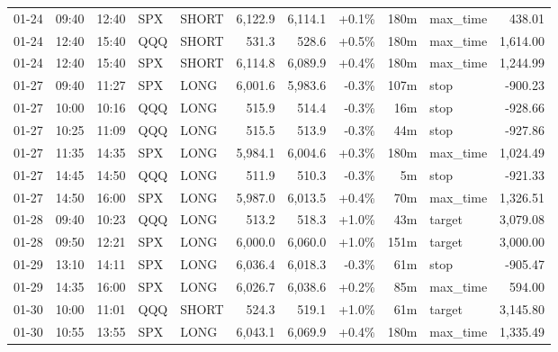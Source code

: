 \documentclass[11pt,a4paper,twoside]{article}
\begin{document}
\begin{center}
\begin{longtable}{>{\color{txtmain}}l l l l l r r r r >{\color{txtmain}}l r}
01-24 & 09:40 & 12:40 & SPX & SHORT & 6,122.9 & 6,114.1 & \textcolor{wingreen}{+0.1\%} & 180m & max\_time & \textcolor{wingreen}{438.01} \\
01-24 & 12:40 & 15:40 & QQQ & SHORT & 531.3 & 528.6 & \textcolor{wingreen}{+0.5\%} & 180m & max\_time & \textcolor{wingreen}{1,614.00} \\
01-24 & 12:40 & 15:40 & SPX & SHORT & 6,114.8 & 6,089.9 & \textcolor{wingreen}{+0.4\%} & 180m & max\_time & \textcolor{wingreen}{1,244.99} \\
01-27 & 09:40 & 11:27 & SPX & LONG & 6,001.6 & 5,983.6 & \textcolor{lossred}{-0.3\%} & 107m & stop & \textcolor{lossred}{-900.23} \\
01-27 & 10:00 & 10:16 & QQQ & LONG & 515.9 & 514.4 & \textcolor{lossred}{-0.3\%} & 16m & stop & \textcolor{lossred}{-928.66} \\
01-27 & 10:25 & 11:09 & QQQ & LONG & 515.5 & 513.9 & \textcolor{lossred}{-0.3\%} & 44m & stop & \textcolor{lossred}{-927.86} \\
01-27 & 11:35 & 14:35 & SPX & LONG & 5,984.1 & 6,004.6 & \textcolor{wingreen}{+0.3\%} & 180m & max\_time & \textcolor{wingreen}{1,024.49} \\
01-27 & 14:45 & 14:50 & QQQ & LONG & 511.9 & 510.3 & \textcolor{lossred}{-0.3\%} & 5m & stop & \textcolor{lossred}{-921.33} \\
01-27 & 14:50 & 16:00 & SPX & LONG & 5,987.0 & 6,013.5 & \textcolor{wingreen}{+0.4\%} & 70m & max\_time & \textcolor{wingreen}{1,326.51} \\
01-28 & 09:40 & 10:23 & QQQ & LONG & 513.2 & 518.3 & \textcolor{wingreen}{+1.0\%} & 43m & target & \textcolor{wingreen}{3,079.08} \\
01-28 & 09:50 & 12:21 & SPX & LONG & 6,000.0 & 6,060.0 & \textcolor{wingreen}{+1.0\%} & 151m & target & \textcolor{wingreen}{3,000.00} \\
01-29 & 13:10 & 14:11 & SPX & LONG & 6,036.4 & 6,018.3 & \textcolor{lossred}{-0.3\%} & 61m & stop & \textcolor{lossred}{-905.47} \\
01-29 & 14:35 & 16:00 & SPX & LONG & 6,026.7 & 6,038.6 & \textcolor{wingreen}{+0.2\%} & 85m & max\_time & \textcolor{wingreen}{594.00} \\
01-30 & 10:00 & 11:01 & QQQ & SHORT & 524.3 & 519.1 & \textcolor{wingreen}{+1.0\%} & 61m & target & \textcolor{wingreen}{3,145.80} \\
01-30 & 10:55 & 13:55 & SPX & LONG & 6,043.1 & 6,069.9 & \textcolor{wingreen}{+0.4\%} & 180m & max\_time & \textcolor{wingreen}{1,335.49} \\

\end{longtable}
\end{center}
\end{document}
